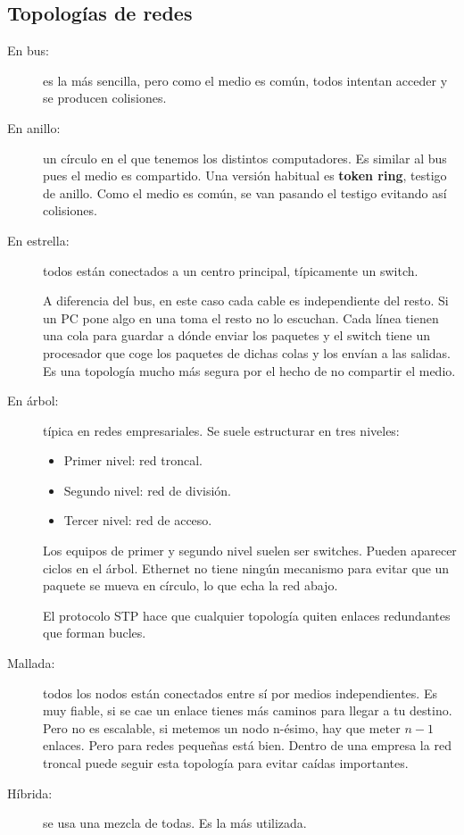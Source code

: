 \subsection{Topologías de redes}
\begin{description}
    \item[En bus:] es la más sencilla, pero como el medio es común, todos intentan acceder y se producen colisiones. 
    \item[En anillo:] un círculo en el que tenemos los distintos computadores. Es similar al bus pues el medio es compartido. Una versión habitual es \textbf{token ring}, testigo de anillo. Como el medio es común, se van pasando el testigo evitando así colisiones. 
    \item[En estrella:] todos están conectados a un centro principal, típicamente un switch. 

    A diferencia del bus, en este caso cada cable es independiente del resto. Si un PC pone algo en una toma el resto no lo escuchan. Cada línea tienen una cola para guardar a dónde enviar los paquetes y el switch tiene un procesador que coge los paquetes de dichas colas y los envían a las salidas. Es una topología mucho más segura por el hecho de no compartir el medio. 

    \item[En árbol:] típica en redes empresariales. Se suele estructurar en tres niveles:
    \begin{itemize}
        \item Primer nivel: red troncal.
        \item Segundo nivel: red de división.
        \item Tercer nivel: red de acceso. 
    \end{itemize}
    Los equipos de primer y segundo nivel suelen ser switches. Pueden aparecer ciclos en el árbol. Ethernet no tiene ningún mecanismo para evitar que un paquete se mueva en círculo, lo que echa la red abajo. 

    El protocolo STP hace que cualquier topología quiten enlaces redundantes que forman bucles. 

    \item[Mallada:] todos los nodos están conectados entre sí por medios independientes. Es muy fiable, si se cae un enlace tienes más caminos para llegar a tu destino. Pero no es escalable, si metemos un nodo n-ésimo, hay que meter $n-1$ enlaces. Pero para redes pequeñas está bien. 
    Dentro de una empresa la red troncal puede seguir esta topología para evitar caídas importantes. 

    \item[Híbrida:] se usa una mezcla de todas. Es la más utilizada.   
\end{description}

